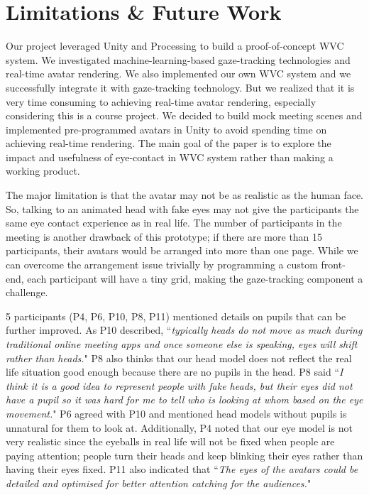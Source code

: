 
\section{Limitations \& Future Work}

Our project leveraged Unity and Processing to build a proof-of-concept WVC system. We investigated machine-learning-based gaze-tracking technologies and real-time avatar rendering. We also implemented our own WVC system and we successfully integrate it with gaze-tracking technology. But we realized that it is very time consuming to achieving real-time avatar rendering, especially considering this is a course project. We decided to build mock meeting scenes and implemented pre-programmed avatars in Unity to avoid spending time on achieving real-time rendering. The main goal of the paper is to explore the impact and usefulness of eye-contact in WVC system rather than making a working product.

The major limitation is that the avatar may not be as realistic as the human face. So, talking to an animated head with fake eyes may not give the participants the same eye contact experience as in real life. The number of participants in the meeting is another drawback of this prototype; if there are more than 15 participants, their avatars would be arranged into more than one page. While we can overcome the arrangement issue trivially by programming a custom front-end, each participant will have a tiny grid, making the gaze-tracking component a challenge. 

5 participants (P4, P6,  P10, P8, P11) mentioned details on pupils that can be further improved. As P10 described,  ``\textit{typically heads do not move as much during traditional online meeting apps and once someone else is speaking, eyes will shift rather than heads.}" P8 also thinks that our head model does not reflect the real life situation good enough because there are no pupils in the head. P8 said ``\textit{I think it is a good idea to represent people with fake heads, but their eyes did not have a pupil so it was hard for me to tell who is looking at whom based on the eye movement.}" P6 agreed with P10 and mentioned head models without pupils is unnatural for them to look at. Additionally, P4 noted that our eye model is not very realistic since the eyeballs in real life will not be fixed when people are paying attention; people turn their heads and keep blinking their eyes rather than having their eyes fixed. P11 also indicated that ``\textit{The eyes of the avatars could be detailed and optimised for better attention catching for the audiences.}"

